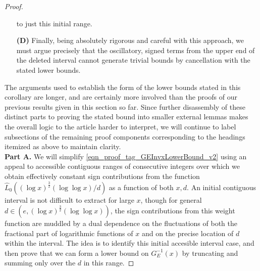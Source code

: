 \documentclass[11pt,reqno,a4letter]{article}
\numberwithin{figure}{section}
\numberwithin{table}{section}
\theoremstyle{plain}
\numberwithin{theorem}{section}
\theoremstyle{definition}
\begin{document}
\begin{proof}
\begin{itemize}[itemsep=0pt,topsep=4pt,leftmargin=0.75in]
     to just this initial range. 
\item[\textbf{(D)}] Finally, being absolutely rigorous and careful with this approach, 
     we must argue precisely 
     that the oscillatory, signed terms from the upper end of the deleted interval 
     cannot generate trivial bounds by cancellation with the stated lower bounds. 
\end{itemize} 
The arguments used to establish the form of the lower bounds stated in this 
corollary are longer, and are certainly more involved than the 
proofs of our previous results given in this section so far. 
Since further disassembly of these distinct parts to proving the stated bound into 
smaller external lemmas makes 
the overall logic to the article harder to interpret, 
we will continue to label subsections of the remaining proof components 
corresponding to the headings itemized as above to maintain clarity. \\ 
\textbf{Part A.} 
We will simplify \eqref{eqn_proof_tag_GEInvxLowerBound_v2} using an appeal to accessible contiguous 
ranges of consecutive integers over which we obtain 
effectively constant sign contributions from the 
function $\widehat{L}_0((\log x)^{\frac{3}{2}} (\log\log x) / d)$ as a function of both $x,d$. 
An initial contiguous interval is not difficult to extract for large $x$, though for 
general $d \in \left(e, (\log x)^{\frac{3}{2}} (\log\log x)\right)$, the 
sign contributions from this weight function are muddled 
by a dual dependence on the fluctuations of both the fractional part of 
logarithmic functions of $x$ and 
on the precise location of $d$ within the interval. 
The idea is to identify this initial accesible interval case, and then prove that we can 
form a lower bound on $G_E^{-1}(x)$ by truncating and summing only over the $d$ in this range. 


\end{proof}
\end{document}
